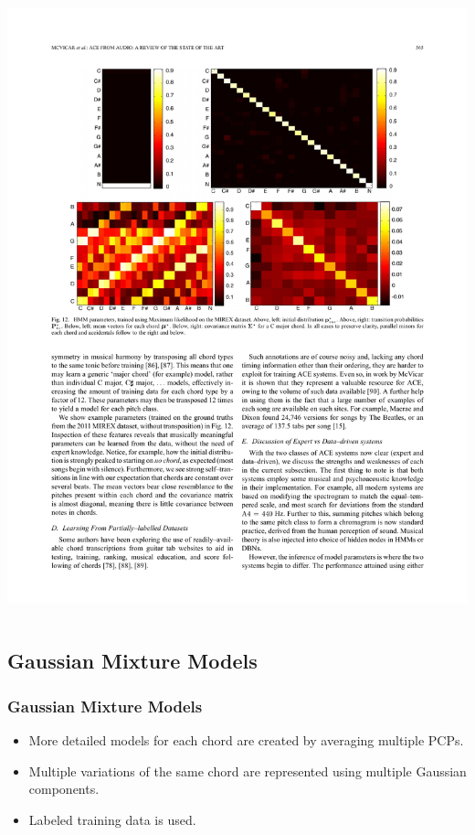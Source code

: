 \documentclass{beamer}
\begin{document}
\begin{frame}
\begin{columns}
\begin{column}{.4\textwidth}
	\includegraphics[width=.95\textwidth]{transitionProbabilities2.pdf}
	\end{column}
	\end{columns}
\end{frame}

\subsection{Gaussian Mixture Models}

\begin{frame}
	\frametitle{Gaussian Mixture Models}
	\begin{itemize}
		\item More detailed models for each chord are created by averaging multiple PCPs.
		\item Multiple variations of the same chord are represented using multiple Gaussian components.
		\item Labeled training data is used.
	\end{itemize}
\end{frame}
\end{document}
